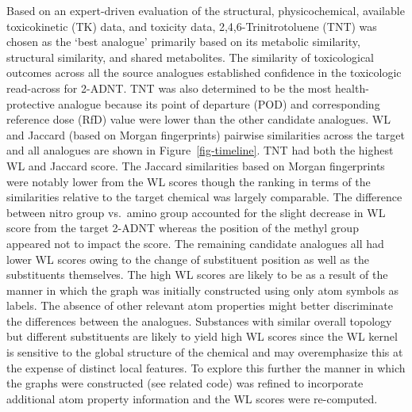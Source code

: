 \documentclass[
  super,
  preprint,
  3p]{elsarticle}
\begin{document}
Based on an expert-driven evaluation of the structural, physicochemical,
available toxicokinetic (TK) data, and toxicity data,
2,4,6-Trinitrotoluene (TNT) was chosen as the `best analogue' primarily
based on its metabolic similarity, structural similarity, and shared
metabolites. The similarity of toxicological outcomes across all the
source analogues established confidence in the toxicologic read-across
for 2-ADNT. TNT was also determined to be the most health-protective
analogue because its point of departure (POD) and corresponding
reference dose (RfD) value were lower than the other candidate
analogues. WL and Jaccard (based on Morgan fingerprints) pairwise
similarities across the target and all analogues are shown in
Figure~\ref{fig-timeline}. TNT had both the highest WL and Jaccard
score. The Jaccard similarities based on Morgan fingerprints were
notably lower from the WL scores though the ranking in terms of the
similarities relative to the target chemical was largely comparable. The
difference between nitro group vs.~amino group accounted for the slight
decrease in WL score from the target 2-ADNT whereas the position of the
methyl group appeared not to impact the score. The remaining candidate
analogues all had lower WL scores owing to the change of substituent
position as well as the substituents themselves. The high WL scores are
likely to be as a result of the manner in which the graph was initially
constructed using only atom symbols as labels. The absence of other
relevant atom properties might better discriminate the differences
between the analogues. Substances with similar overall topology but
different substituents are likely to yield high WL scores since the WL
kernel is sensitive to the global structure of the chemical and may
overemphasize this at the expense of distinct local features. To explore
this further the manner in which the graphs were constructed (see
related code) was refined to incorporate additional atom property
information and the WL scores were re-computed.
\end{document}

